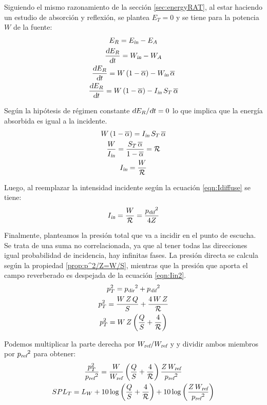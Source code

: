 \documentclass[a5paper,12pt,twoside]{book}
\begin{document}
Siguiendo el mismo razonamiento de la sección \ref{sec:energyRAT}, al estar haciendo un estudio de absorción y reflexión, se plantea $E_T=0$ y se tiene para la potencia $W$ de la fuente:
\begin{gather*}
    E_R = {{E}_\textsl{{in}}} - E_A
    \\
    \frac{\textsl{d} E_R}{\textsl{d} t} = {{W}_\textsl{{in}}} - W_A
    \\
    \frac{\textsl{d} E_R}{\textsl{d} t} = W \left(1-\overline{\alpha}\right) - {{W}_\textsl{{in}}} \, \overline{\alpha}
    \\
    \frac{\textsl{d} E_R}{\textsl{d} t} = W \left(1-\overline{\alpha}\right) - {{I}_\textsl{{in}}} \, S_T \, \overline{\alpha}
\end{gather*}

Según la hipótesis de régimen constante $\textsl{d} E_R/\textsl{d} t=0$ lo que implica que la energía absorbida es igual a la incidente.
\begin{gather*}
    W \left(1-\overline{\alpha}\right) = {{I}_\textsl{{in}}} \, S_T \, \overline{\alpha}
    \\
    \frac{W}{{{I}_\textsl{{in}}}} = \frac{S_T \, \overline{\alpha}}{1-\overline{\alpha}} = \mathcal{R}
    \\
    {{I}_\textsl{{in}}} = \frac{W}{\mathcal{R}}
\end{gather*}

Luego, al reemplazar la intensidad incidente según la ecuación \ref{eqn:Idiffuse} se tiene:
\begin{equation}
    {{I}_\textsl{{in}}} = \frac{W}{\mathcal{R}} = \frac{{{p}_\textsl{{dif}}}^2}{4 Z}
    \label{eqn:Iin2}
\end{equation}

Finalmente, planteamos la presión total que va a incidir en el punto de escucha.
Se trata de una suma no correlacionada, ya que al tener todas las direcciones igual probabilidad de incidencia, hay infinitas fases.
La presión directa se calcula según la propiedad \ref{prop:p^2/Z=W/S}, mientras que la presión que aporta el campo reverberado es despejada de la ecuación \ref{eqn:Iin2}.
\begin{gather}
    p_T^2 = {{p}_\textsl{{dir}}}^2 + {{p}_\textsl{{dif}}}^2
    \notag
    \\
    p_T^2 = \frac{W \, Z \, Q}{S} + \frac{4 \, W \, Z}{\mathcal{R}}
    \notag
    \\
    p_T^2 = W\,Z \left( \frac{Q}{S} + \frac{4}{\mathcal{R}}\right)
    \label{eqn:criticalDist}
\end{gather}

Podemos multiplicar la parte derecha por ${{W}_\textsl{{ref}}}/{{W}_\textsl{{ref}}}$ y y dividir ambos miembros por ${{p}_\textsl{{ref}}}^2$ para obtener:
\begin{gather*}
    \frac{p_T^2}{{{p}_\textsl{{ref}}}^2} = \frac{W}{{{W}_\textsl{{ref}}}} \left( \frac{Q}{S} + \frac{4}{\mathcal{R}}\right) \frac{Z \, {{W}_\textsl{{ref}}}}{{{p}_\textsl{{ref}}}^2}
    \\
    SPL_T = L_W + 10 \log \left( \frac{Q}{S} + \frac{4}{\mathcal{R}} \right) + 10 \log \left( \frac{Z \, {{W}_\textsl{{ref}}}}{{{p}_\textsl{{ref}}}^2} \right)
\end{gather*}
\end{document}
